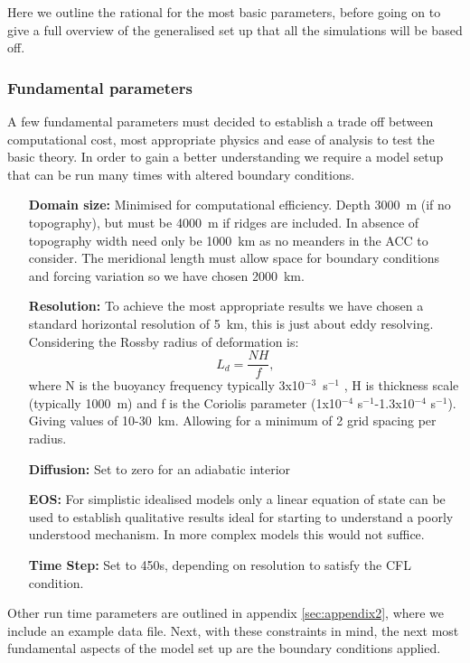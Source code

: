 Here we outline the rational for the most basic parameters, before going on to give a full overview of the generalised set up that all the simulations will be based off. 
\subsubsection{Fundamental parameters}
A few fundamental parameters must decided to establish a trade off between computational cost, most appropriate physics and ease of analysis to test the basic theory. In order to gain a better understanding we require a model setup that can be run many times with altered boundary conditions.
\begin{itemize}
\item[\textbf{Domain size:}] Minimised for computational efficiency. Depth 3000~m (if no topography), but must be 4000~m if ridges are included. In absence of topography width need only be 1000~km as no meanders in the ACC to consider. The meridional length must allow space for boundary conditions and forcing variation so we have chosen 2000~km.  
\item[\textbf{Resolution:}] To achieve the most appropriate results we have chosen a standard horizontal resolution of 5~km, this is just about eddy resolving. Considering the Rossby radius of deformation is: \begin{equation}
L_{d} = \frac{NH}{f},
\end{equation} 
where N is the buoyancy frequency typically 3x10$^{-3}$~s$^{-1}$ , H is thickness scale (typically 1000~m) and f is the Coriolis parameter (1x10$^{-4}$ s$^{-1}$-1.3x10$^{-4}$ s$^{-1}$). Giving values of 10-30~km. Allowing for a minimum of 2 grid spacing per radius.
\item[\textbf{Diffusion:}] Set to zero for an adiabatic interior
\item[\textbf{EOS:}] For simplistic idealised models only a linear equation of state can be used to establish qualitative results ideal for starting to understand a poorly understood mechanism. In more complex models this would not suffice.
\item[\textbf{Time Step:}]Set to 450s, depending on resolution to satisfy the \gls{CFL} condition.
\end{itemize}
Other run time parameters are outlined in appendix \ref{sec:appendix2}, where we include an example data file. Next, with these constraints in mind, the next most fundamental aspects of the model set up are the boundary conditions applied.

